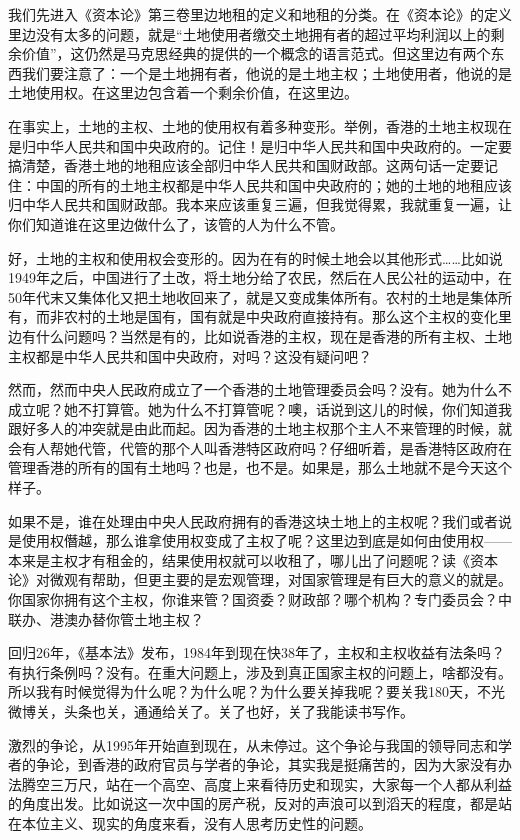 \documentclass[UTF8, 12pt, a4paper]{ctexrep}
\begin{document}
我们先进入《资本论》第三卷里边地租的定义和地租的分类。在《资本论》的定义里边没有太多的问题，就是“土地使用者缴交土地拥有者的超过平均利润以上的剩余价值”，这仍然是马克思经典的提供的一个概念的语言范式。但这里边有两个东西我们要注意了：一个是土地拥有者，他说的是土地主权；土地使用者，他说的是土地使用权。在这里边包含着一个剩余价值，在这里边。

在事实上，土地的主权、土地的使用权有着多种变形。举例，香港的土地主权现在是归中华人民共和国中央政府的。记住！是归中华人民共和国中央政府的。一定要搞清楚，香港土地的地租应该全部归中华人民共和国财政部。这两句话一定要记住：中国的所有的土地主权都是中华人民共和国中央政府的；她的土地的地租应该归中华人民共和国财政部。我本来应该重复三遍，但我觉得累，我就重复一遍，让你们知道谁在这里边做什么了，该管的人为什么不管。

好，土地的主权和使用权会变形的。因为在有的时候土地会以其他形式……比如说1949年之后，中国进行了土改，将土地分给了农民，然后在人民公社的运动中，在50年代末又集体化又把土地收回来了，就是又变成集体所有。农村的土地是集体所有，而非农村的土地是国有，国有就是中央政府直接持有。那么这个主权的变化里边有什么问题吗？当然是有的，比如说香港的主权，现在是香港的所有主权、土地主权都是中华人民共和国中央政府，对吗？这没有疑问吧？

然而，然而中央人民政府成立了一个香港的土地管理委员会吗？没有。她为什么不成立呢？她不打算管。她为什么不打算管呢？噢，话说到这儿的时候，你们知道我跟好多人的冲突就是由此而起。因为香港的土地主权那个主人不来管理的时候，就会有人帮她代管，代管的那个人叫香港特区政府吗？仔细听着，是香港特区政府在管理香港的所有的国有土地吗？也是，也不是。如果是，那么土地就不是今天这个样子。

如果不是，谁在处理由中央人民政府拥有的香港这块土地上的主权呢？我们或者说是使用权僭越，那么谁拿使用权变成了主权了呢？这里边到底是如何由使用权——本来是主权才有租金的，结果使用权就可以收租了，哪儿出了问题呢？读《资本论》对微观有帮助，但更主要的是宏观管理，对国家管理是有巨大的意义的就是。你国家你拥有这个主权，你谁来管？国资委？财政部？哪个机构？专门委员会？中联办、港澳办替你管土地主权？

回归26年，《基本法》发布，1984年到现在快38年了，主权和主权收益有法条吗？有执行条例吗？没有。在重大问题上，涉及到真正国家主权的问题上，啥都没有。所以我有时候觉得为什么呢？为什么呢？为什么要关掉我呢？要关我180天，不光微博关，头条也关，通通给关了。关了也好，关了我能读书写作。

激烈的争论，从1995年开始直到现在，从未停过。这个争论与我国的领导同志和学者的争论，到香港的政府官员与学者的争论，其实我是挺痛苦的，因为大家没有办法腾空三万尺，站在一个高空、高度上来看待历史和现实，大家每一个人都从利益的角度出发。比如说这一次中国的房产税，反对的声浪可以到滔天的程度，都是站在本位主义、现实的角度来看，没有人思考历史性的问题。
\end{document}
